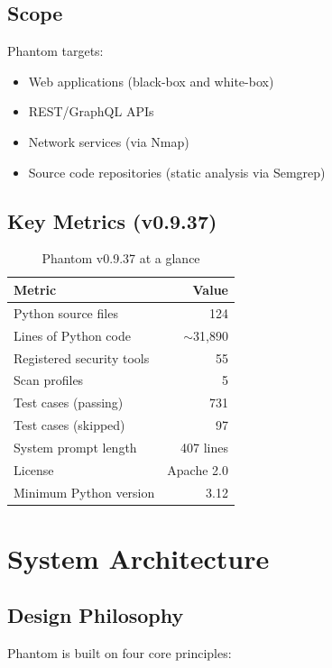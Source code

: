 \documentclass[12pt,a4paper]{report}
\begin{document}
\section{Scope}
Phantom targets:
\begin{itemize}[noitemsep]
  \item Web applications (black-box and white-box)
  \item REST/GraphQL APIs
  \item Network services (via Nmap)
  \item Source code repositories (static analysis via Semgrep)
\end{itemize}

\section{Key Metrics (v0.9.37)}
\begin{table}[H]
\centering
\caption{Phantom v0.9.37 at a glance}
\label{tab:metrics}
\begin{tabular}{lr}
\toprule
\textbf{Metric} & \textbf{Value} \\
\midrule
Python source files           & 124 \\
Lines of Python code          & $\sim$31,890 \\
Registered security tools     & 55  \\
Scan profiles                 & 5   \\
Test cases (passing)          & 731 \\
Test cases (skipped)          & 97  \\
System prompt length          & 407 lines \\
License                       & Apache 2.0 \\
Minimum Python version        & 3.12 \\
\bottomrule
\end{tabular}
\end{table}


\chapter{System Architecture}
\label{ch:arch}

\section{Design Philosophy}
Phantom is built on four core principles:
\end{document}
